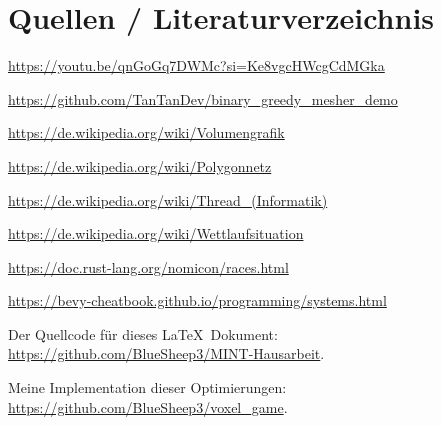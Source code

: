 \section{Quellen / Literaturverzeichnis}


\renewcommand{\section}[2]{}

\begin{thebibliography}{9}

\setlength{\itemindent}{0.5cm}

\url{https://youtu.be/qnGoGq7DWMc?si=Ke8vgcHWcgCdMGka}

\url{https://github.com/TanTanDev/binary_greedy_mesher_demo}

\url{https://de.wikipedia.org/wiki/Volumengrafik}

\url{https://de.wikipedia.org/wiki/Polygonnetz}

\url{https://de.wikipedia.org/wiki/Thread_(Informatik)}

\url{https://de.wikipedia.org/wiki/Wettlaufsituation}

\url{https://doc.rust-lang.org/nomicon/races.html}

\url{https://bevy-cheatbook.github.io/programming/systems.html}

\end{thebibliography}


\vspace{0.2cm}

\setlength{\parindent}{0pt}

Der Quellcode für dieses \LaTeX\ Dokument: \\
\url{https://github.com/BlueSheep3/MINT-Hausarbeit}.

\vspace{0.2cm}

Meine Implementation dieser Optimierungen: \\
\url{https://github.com/BlueSheep3/voxel_game}.
